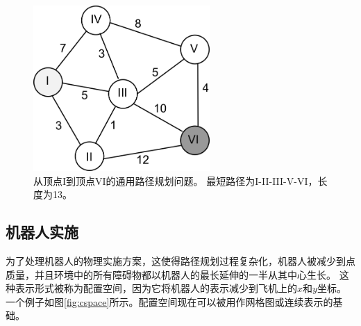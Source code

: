 \begin{figure}[!htb]
\centering
\includegraphics[width=0.6\textwidth]{figs/dijkstra}
\caption{从顶点I到顶点VI的通用路径规划问题。 最短路径为I-II-III-V-VI，长度为13。} 
\label{fig:pathproblem}
\end{figure}

\subsection{机器人实施}

为了处理机器人的物理实施方案，这使得路径规划过程复杂化，机器人被减少到点质量，并且环境中的所有障碍物都以机器人的最长延伸的一半从其中心生长。 这种表示形式被称为配置空间，因为它将机器人的表示减少到飞机上的$ x $和$ y $坐标。 一个例子如图\ref{fig:cspace}所示。配置空间现在可以被用作网格图或连续表示的基础。

